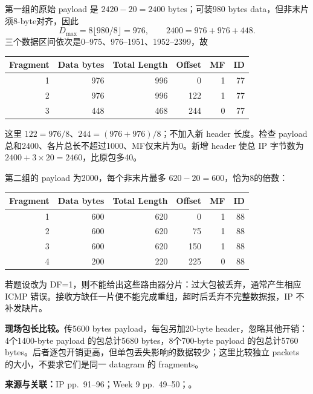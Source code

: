 \begin{workedsolution}
第一组的原始 payload 是 $2420-20=2400$ bytes；可装980 bytes data，但非末片须8-byte对齐，因此
\[
 D_{\max}=8\lfloor980/8\rfloor=976,\qquad
 2400=976+976+448.
\]
三个数据区间依次是0--975、976--1951、1952--2399，故
\begin{center}
\begin{tabular}{@{}rrrrrr@{}}
\toprule
Fragment & Data bytes & Total Length & Offset & MF & ID \\
\midrule
1 & 976 & 996 & 0 & 1 & 77 \\
2 & 976 & 996 & 122 & 1 & 77 \\
3 & 448 & 468 & 244 & 0 & 77 \\
\bottomrule
\end{tabular}
\end{center}
这里 $122=976/8$、$244=(976+976)/8$；不加入新 header 长度。检查 payload 总和2400、各片总长不超过1000、MF仅末片为0。新增 header 使总 IP 字节数为 $2400+3\times20=2460$，比原包多40。

第二组的 payload 为2000，每个非末片最多 $620-20=600$，恰为8的倍数：
\begin{center}
\begin{tabular}{@{}rrrrrr@{}}
\toprule
Fragment & Data bytes & Total Length & Offset & MF & ID \\
\midrule
1 & 600 & 620 & 0 & 1 & 88 \\
2 & 600 & 620 & 75 & 1 & 88 \\
3 & 600 & 620 & 150 & 1 & 88 \\
4 & 200 & 220 & 225 & 0 & 88 \\
\bottomrule
\end{tabular}
\end{center}
若题设改为 DF=1，则不能给出这些路由器分片：过大包被丢弃，通常产生相应 ICMP 错误。接收方缺任一片便不能完成重组，超时后丢弃不完整数据报，IP 不补发缺片。

\textbf{现场包长比较。}传5600 bytes payload，每包另加20-byte header，忽略其他开销：4个1400-byte payload 的包总计5680 bytes，8个700-byte payload 的包总计5760 bytes。后者逐包开销更高，但单包丢失影响的数据较少；这里比较独立 packets 的大小，不要求它们是同一 datagram 的 fragments。
\end{workedsolution}


\textbf{来源与关联：}IP pp.~91--96；Week 9 pp.~49--50；。

